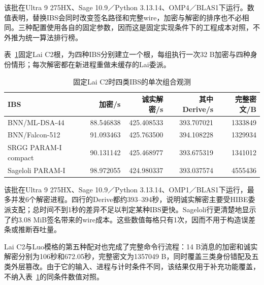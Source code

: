 \documentclass[UTF8,a4paper,12pt,oneside,openany,fontset=fandol]{ctexrep}
\begin{document}
该批在Ultra 9 275HX、Sage 10.9／Python 3.13.14、OMP4／BLAS1下运行。数值表明，替换IBS会同时改变签名路径和完整wire，加密与解密的排序也不必相同。三种配置使用各自的固定参数，因而这是固定实现条件下的工程成本对照，不外推为统一算法排行榜。

表~\ref{tab:lai-four-ibs}固定Lai C2根，为四种IBS分别建立一个根，每组执行一次32 B加密与四种身份情形；每次解密都在新进程重做未缓存的Lai委派。

\begin{table}[htbp]
\centering
\small
\caption{固定Lai C2时四类IBS的单次组合观测}
\label{tab:lai-four-ibs}
\begin{tabular}{@{}lrrrr@{}}
\toprule
\rowcolor{black!8} IBS & 加密/s & 诚实解密/s & 其中Derive/s & 完整密文/B \\
\midrule
BNN/ML-DSA-44 & 88.546838 & 425.408533 & 393.707021 & 1333849 \\
BNN/Falcon-512 & 91.093463 & 425.763500 & 394.108228 & 1329934 \\
SRGG PARAM-I compact & 90.131142 & 425.468977 & 393.675319 & 1341012 \\
Sageloli PARAM-I & 98.972055 & 424.980337 & 393.037574 & 4555436 \\
\bottomrule
\end{tabular}
\end{table}

该批在Ultra 9 275HX、Sage 10.9／Python 3.13.14、OMP1／BLAS1下运行，最多并发6个解密进程。四行的Derive都约393--394秒，说明诚实解密主要受HIBE委派支配；总时间不到1秒的差异不足以判定某种IBS更快。Sageloli行更清楚地显示了约3.08 MiB签名带来的wire成本。这些数值每格只有1次，因而不用于构造误差条或推断吞吐量。

Lai C2与Luo模格的第五种配对也完成了完整命令行流程：14 B消息的加密和诚实解密分别为106秒和672.05秒，完整密文为1357049 B，同时覆盖三类身份错配及五类外层篡改。由于它的输入、进程与计时条件不同，该结果仅用于补充功能覆盖，不纳入表~\ref{tab:lai-four-ibs}的同条件数值对照。
\end{document}
